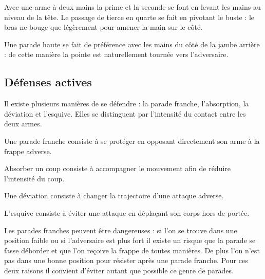 Avec une arme à deux mains la prime et la seconde se font en levant les mains au niveau de la tête.
Le passage de tierce en quarte se fait en pivotant le buste : le bras ne bouge que légèrement pour amener la main sur le côté.

Une parade haute se fait de préférence avec les mains du côté de la jambe arrière : de cette manière la pointe est naturellement tournée vers l'adversaire.


\subsection{Défenses actives}


Il existe plusieurs manières de se défendre : la parade franche, l'absorption, la déviation et l'esquive.
Elles se distinguent par l'intensité du contact entre les deux armes.


\begin{definition}

	Une parade franche consiste à se protéger en opposant directement son arme à la frappe adverse.
\end{definition}


\begin{definition}[Absorption]

	Absorber un coup consiste à accompagner le mouvement afin de réduire l'intensité du coup.
\end{definition}


\begin{definition}[Déviation]

	Une déviation consiste à changer la trajectoire d'une attaque adverse.
\end{definition}


\begin{definition}[Esquive]

	L'esquive consiste à éviter une attaque en déplaçant son corps hors de portée.
\end{definition}


Les parades franches peuvent être dangereuses : si l'on se trouve dans une position faible ou si l'adversaire est plus fort il existe un risque que la parade se fasse déborder et que l'on reçoive la frappe de toutes manières.
De plus l'on n'est pas dans une bonne position pour résister après une parade franche.
Pour ces deux raisons il convient d'éviter autant que possible ce genre de parades.


